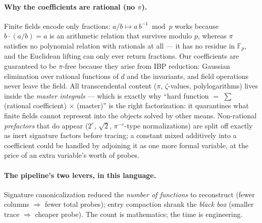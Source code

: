 \documentclass[11pt]{article}
\newcommand{\eps}{\varepsilon}
\newcommand{\Fp}{\mathbb{F}_p}
\begin{document}
\paragraph{Why the coefficients are rational (no $\pi$).}
Finite fields encode only fractions: $a/b \mapsto a\, b^{-1} \bmod
p$ works because $b \cdot (a/b) = a$ is an arithmetic relation that
survives modulo $p$, whereas $\pi$ satisfies no polynomial relation
with rationals at all --- it has no residue in $\Fp$, and the
Euclidean lifting can only ever return fractions.  Our coefficients
are guaranteed to be $\pi$-free because they arise from IBP
reduction: Gaussian elimination over rational functions of $d$ and
the invariants, and field operations never leave the field.  All
transcendental content ($\pi$, $\zeta$-values, polylogarithms)
lives inside the \emph{master integrals} --- which is exactly why
``hard function $=$ $\sum$ (rational coefficient) $\times$
(master)'' is the right factorization: it quarantines what
finite fields cannot represent into the objects solved by other
means.  Non-rational \emph{prefactors} that do appear
($2^{\eps}$, $\sqrt2$, $\pi^{-\eps}$-type normalizations) are
split off exactly as inert signature factors before tracing; a
constant mixed additively into a coefficient could be handled by
adjoining it as one more formal variable, at the price of an extra
variable's worth of probes.

\paragraph{The pipeline's two levers, in this language.}
Signature canonicalization reduced the \emph{number of functions} to
reconstruct (fewer columns $\Rightarrow$ fewer total probes); entry
compaction shrank the \emph{black box} (smaller trace $\Rightarrow$
cheaper probe).  The count is mathematics; the time is engineering.
\end{document}
